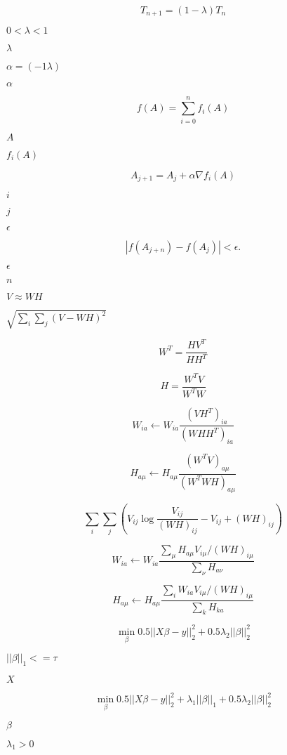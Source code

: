 \documentclass{article}
\begin{document}
\[ T_{n+1} = (1-\lambda) T_{n} \]
\pagebreak

$ 0<\lambda<1 $
\pagebreak

$ \lambda $
\pagebreak

$ \alpha = (-1 \lambda) $
\pagebreak

$ \alpha $
\pagebreak

\[ f(A) = \sum_{i = 0}^{n} f_i(A) \]
\pagebreak

$ A $
\pagebreak

$ f_i(A) $
\pagebreak

\[ A_{j + 1} = A_j + \alpha \nabla f_i(A) \]
\pagebreak

$ i $
\pagebreak

$ j $
\pagebreak

$ \epsilon $
\pagebreak

\[ | f(A_{j + n}) - f(A_j) | < \epsilon. \]
\pagebreak

$\epsilon$
\pagebreak

$n$
\pagebreak

$ V \approx WH $
\pagebreak

$ \sqrt{\sum_i \sum_j(V-WH)^2} $
\pagebreak

\[ W^T = \frac{H V^T}{H H^T} \]
\pagebreak

\[ H = \frac{W^T V}{W^T W} \]
\pagebreak

\[ W_{ia} \leftarrow W_{ia} \frac{(VH^T)_{ia}}{(WHH^T)_{ia}} \]
\pagebreak

\[ H_{a\mu} \leftarrow H_{a\mu} \frac{(W^T V)_{a\mu}}{(W^T WH)_{a\mu}} \]
\pagebreak

\[ \sum_i \sum_j (V_{ij} \log\frac{V_{ij}}{(W H)_{ij}} - V_{ij} + (W H)_{ij}) \]
\pagebreak

\[ W_{ia} \leftarrow W_{ia} \frac{\sum_{\mu} H_{a\mu} V_{i\mu} / (W H)_{i\mu}} {\sum_{\nu} H_{a\nu}} \]
\pagebreak

\[ H_{a\mu} \leftarrow H_{a\mu} \frac{\sum_{i} W_{ia} V_{i\mu}/(WH)_{i\mu}} {\sum_{k} H_{ka}} \]
\pagebreak

\[ \min_{\beta} 0.5 || X \beta - y ||_2^2 + 0.5 \lambda_2 || \beta ||_2^2 \]
\pagebreak

$ ||\beta||_1 <= \tau $
\pagebreak

$ X $
\pagebreak

\[ \min_{\beta} 0.5 || X \beta - y ||_2^2 + \lambda_1 || \beta ||_1 + 0.5 \lambda_2 || \beta ||_2^2 \]
\pagebreak

$ \beta $
\pagebreak

$ \lambda_1 > 0 $
\pagebreak
\end{document}
